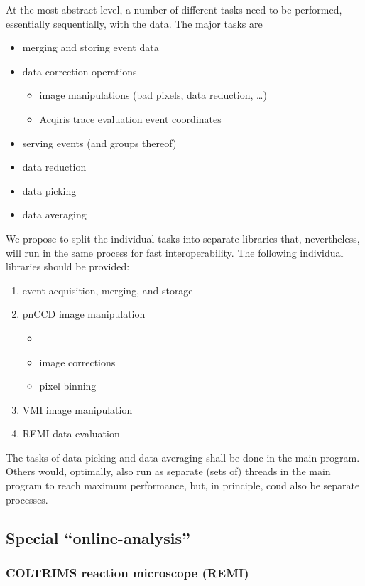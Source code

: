 \documentclass[11pt,a4paper,twoside]{article}
\begin{document}
At the most abstract level, a number of different tasks need to be performed, essentially
sequentially, with the data. The major tasks are
\begin{itemize}
\item merging and storing event data
\item data correction operations
   \begin{itemize}
   \item image manipulations (bad pixels, data reduction, \dots )
   \item Acqiris trace evaluation event coordinates
   \end{itemize}
\item serving events (and groups thereof)
\item data reduction
\item data picking
\item data averaging
\end{itemize}
We propose to split the individual tasks into separate libraries that, nevertheless, will run in the
same process for fast interoperability. The following individual libraries should be provided:

\begin{enumerate}
   \item event acquisition, merging, and storage
   \item pnCCD image manipulation
      \begin{itemize}\item 
      \item image corrections
      \item pixel binning
      \end{itemize}
   \item VMI image manipulation
   \item REMI data evaluation
\end{enumerate}
The tasks of data picking and data averaging shall be done in the main program. Others would,
optimally, also run as separate (sets of) threads in the main program to reach maximum performance,
but, in principle, coud also be separate processes.

\subsection{Special ``online-analysis''}
\label{sec:special-online-analysis}

\subsubsection{COLTRIMS reaction microscope (REMI)}
\label{sec:remi}
\end{document}
